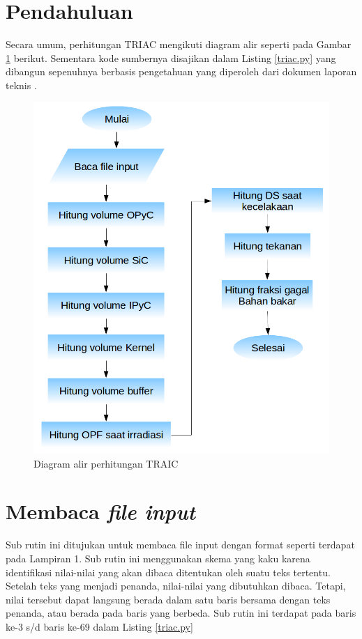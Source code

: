 \documentclass[a4paper,11pt]{report}
\begin{document}
\section{Pendahuluan}
Secara umum, perhitungan TRIAC mengikuti diagram alir seperti pada Gambar \ref{fig:flowchart} berikut. Sementara kode sumbernya disajikan dalam Listing \ref{triac.py} yang dibangun sepenuhnya berbasis pengetahuan yang diperoleh dari dokumen laporan teknis \cite{report1}.
\begin{figure}[h]
  \centering
  \includegraphics[scale=.5]{pics/Flowchart.png}
  \caption{Diagram alir perhitungan TRAIC}
  \label{fig:flowchart}
\end{figure}

\vfill
\scriptsize

\normalsize

\section{Membaca \textit{file input}}
Sub rutin ini ditujukan untuk membaca file input dengan format seperti terdapat pada Lampiran 1. Sub rutin ini menggunakan skema yang kaku karena identifikasi nilai-nilai yang akan dibaca ditentukan oleh suatu teks tertentu. Setelah teks yang menjadi penanda, nilai-nilai yang dibutuhkan dibaca. Tetapi, nilai tersebut dapat langsung berada dalam satu baris bersama dengan teks penanda, atau berada pada baris yang berbeda. Sub rutin ini terdapat pada baris ke-3 s/d baris ke-69 dalam Listing \ref{triac.py}
\end{document}
